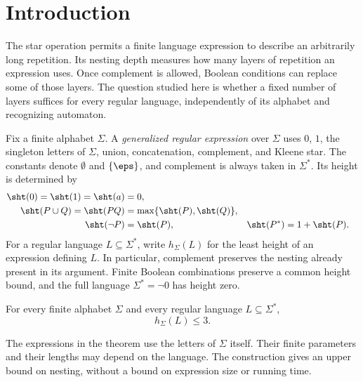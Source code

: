 \begin{abstract}
Every regular language over a finite alphabet has generalized star height
at most three, with complement taken in the same free monoid. We express
finite-monoid computations using a prefix code of word pieces.
\end{abstract}

\section{Introduction}\label{sec:introduction}

The star operation permits a finite language expression to describe an
arbitrarily long repetition. Its nesting depth measures how many layers
of repetition an expression uses. Once complement is allowed, Boolean
conditions can replace some of those layers. The question studied here
is whether a fixed number of layers suffices for every regular language,
independently of its alphabet and recognizing automaton.

Fix a finite alphabet $\Sigma$. A \emph{generalized regular expression}
over $\Sigma$ uses $0$, $1$, the singleton letters of $\Sigma$, union,
concatenation, complement, and Kleene star. The constants denote
$\emptyset$ and $\{\eps\}$, and complement is always taken in $\Sigma^*$.
Its height is determined by
\[
\begin{aligned}
 \sht(0)=\sht(1)=\sht(a)&=0,\\
 \sht(P\cup Q)=\sht(PQ)&=\max\{\sht(P),\sht(Q)\},\\
 \sht(\neg P)&=\sht(P),&
 \sht(P^*)&=1+\sht(P).
\end{aligned}
\]
For a regular language $L\subseteq\Sigma^*$, write $h_\Sigma(L)$ for
the least height of an expression defining $L$. In particular,
complement preserves the nesting already present in its argument. Finite
Boolean combinations preserve a common height bound, and the full
language $\Sigma^*=\neg0$ has height zero.

\begin{theorem}\label{thm:main}
For every finite alphabet $\Sigma$ and every regular language
$L\subseteq\Sigma^*$,
\[
                            h_\Sigma(L)\le3.
\]
\end{theorem}

The expressions in the theorem use the letters of $\Sigma$ itself. Their
finite parameters and their lengths may depend on the language. The
construction gives an upper bound on nesting, without a bound on
expression size or running time.

